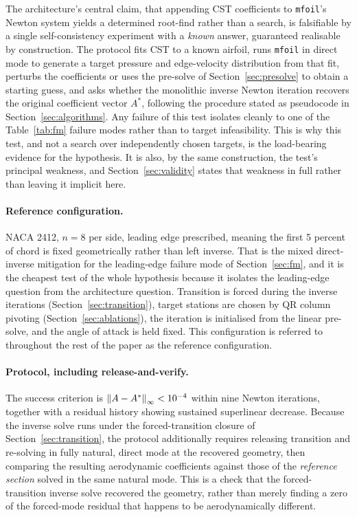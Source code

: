 The architecture's central claim, that appending CST coefficients to
\texttt{mfoil}'s Newton system yields a determined root-find rather than a
search, is falsifiable by a single self-consistency experiment with a
\emph{known} answer, guaranteed realisable by construction. The protocol fits
CST to a known airfoil, runs \texttt{mfoil} in direct mode to generate a
target pressure and edge-velocity distribution from that fit, perturbs the
coefficients or uses the pre-solve of Section~\ref{sec:presolve} to obtain a
starting guess, and asks whether the monolithic inverse Newton iteration
recovers the original coefficient vector $A^\ast$, following the procedure
stated as pseudocode in Section~\ref{sec:algorithms}. Any failure of this test
isolates cleanly to one of the Table~\ref{tab:fm} failure modes rather than to
target infeasibility. This is why this test, and not a search over
independently chosen targets, is the load-bearing evidence for the hypothesis.
It is also, by the same construction, the test's principal weakness, and
Section~\ref{sec:validity} states that weakness in full rather than leaving it
implicit here.

\paragraph{Reference configuration.} NACA 2412, $n=8$ per side, leading edge
prescribed, meaning the first 5 percent of chord is fixed geometrically rather
than left inverse. That is the mixed direct-inverse mitigation for the
leading-edge failure mode of Section~\ref{sec:fm}, and it is the cheapest test
of the whole hypothesis because it isolates the leading-edge question from the
architecture question. Transition is forced during the inverse iterations
(Section~\ref{sec:transition}), target stations are chosen by QR column
pivoting (Section~\ref{sec:ablations}), the iteration is initialised from the
linear pre-solve, and the angle of attack is held fixed. This configuration is
referred to throughout the rest of the paper as the reference configuration.

\paragraph{Protocol, including release-and-verify.} The success criterion is
$\left\|A-A^\ast\right\|_\infty < 10^{-4}$ within nine Newton iterations, together with
a residual history showing sustained superlinear decrease. Because the inverse
solve runs under the forced-transition closure of
Section~\ref{sec:transition}, the protocol additionally requires releasing
transition and re-solving in fully natural, direct mode at the recovered
geometry, then comparing the resulting aerodynamic coefficients against those
of the \emph{reference section} solved in the same natural mode. This is a
check that the forced-transition inverse solve recovered the geometry, rather
than merely finding a zero of the forced-mode residual that happens to be
aerodynamically different.

